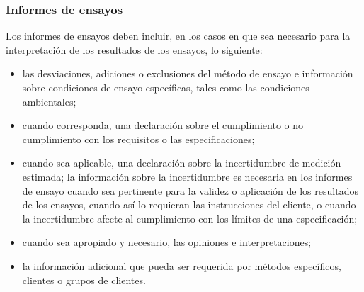 \subsubsection{Informes de ensayos}
\par 
Los informes de ensayos deben incluir, en los casos en que sea necesario para la interpretación de los resultados de los ensayos, lo siguiente:

\begin{itemize}
	\item las desviaciones, adiciones o exclusiones del método de ensayo e información sobre condiciones de
	ensayo específicas, tales como las condiciones ambientales;
	
	\item cuando corresponda, una declaración sobre el cumplimiento o no cumplimiento con los requisitos o las
	especificaciones;
	
	\item cuando sea aplicable, una declaración sobre la incertidumbre de medición estimada; la información
	sobre la incertidumbre es necesaria en los informes de ensayo cuando sea pertinente para la validez o
	aplicación de los resultados de los ensayos, cuando así lo requieran las instrucciones del cliente, o
	cuando la incertidumbre afecte al cumplimiento con los límites de una especificación;
	
	\item cuando sea apropiado y necesario, las opiniones e interpretaciones;
	
	\item la información adicional que pueda ser requerida por métodos específicos, clientes o grupos de clientes.
\end{itemize}
